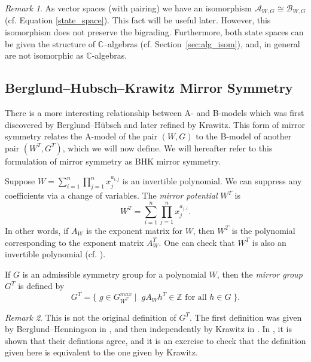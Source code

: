 \documentclass[10pt, letterpaper]{amsart}
\theoremstyle{remark}
\newtheorem{rem}{Remark}[thm]
\newcommand{\CC}{\mathbb C}
\newcommand{\ZZ}{\mathbb{Z}}
\newcommand{\sA}{\mathscr{A}}
\newcommand{\sB}{\mathscr{B}}
\newcommand{\set}[1]{\{#1\}}
\newcommand{\defital}{\textit}
\begin{document}
\begin{rem}\label{r:ABiso}
As vector spaces (with pairing) we have an isomorphism $\sA_{W,G}\cong \sB_{W,G}$ (cf. Equation \ref{state_space}). This fact will be useful later. However, this isomorphism does not preserve the bigrading. Furthermore, both state spaces can be given the structure of $\CC$--algebras (cf. Section~\ref{sec:alg_isom}), and, in general are not isomorphic as $\CC$-algebras. 
\end{rem}



\subsection{Berglund--Hubsch--Krawitz Mirror Symmetry}\label{sec:BHK}
There is a more interesting relationship between A- and B-models which was first discovered by Berglund--H\"ubsch and later refined by Krawitz. This form of mirror symmetry relates the A-model of the pair $(W,G)$ to the B-model of another pair $(W^T, G^T)$, which we will now define. We will hereafter refer to this formulation of mirror symmetry as BHK mirror symmetry.  

Suppose $W=\sum_{i=1}^n  \prod_{j=1}^n x_j^{a_{i,j}}$ is an invertible polynomial. We can suppress any coefficients via a change of variables. The \defital{mirror potential} $W^T$ is 
\[
W^T = \sum_{i=1}^n  \prod_{j=1}^n x_j^{a_{j,i}}. 
\]
In other words, if $A_W$ is the exponent matrix for $W$, then $W^T$ is the polynomial corresponding to the exponent matrix $A_W^T$. One can check that $W^T$ is also an invertible polynomial (cf. \cite{ChR}). 
 
If $G$ is an admissible symmetry group for a polynomial $W$, then the \defital{mirror group} $G^T$ is defined by 
\[
G^T = \set{\; g \in G_{W^T}^{max} \; | \;\;g A_{W} h^T \in \ZZ \text{ for all } h \in G \; }.
\]
\begin{rem}
This is not the original definition of $G^T$. The first definition was given by Berglund--Henningson in \cite{BHen}, and then independently by Krawitz in \cite{Kr}. In \cite{involutions}, it is shown that their defintions agree, and it is an exercise to check that the definition given here is equivalent to the one given by Krawitz. 
\end{rem}
\end{document}
